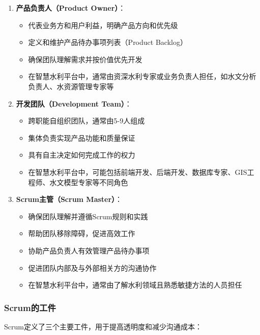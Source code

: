 \begin{enumerate}
\def\labelenumi{\arabic{enumi}.}
\tightlist
\item
  \textbf{产品负责人（Product Owner）}：

  \begin{itemize}
  \tightlist
  \item
    代表业务方和用户利益，明确产品方向和优先级
  \item
    定义和维护产品待办事项列表（Product Backlog）
  \item
    确保团队理解需求并按价值优先开发
  \item
    在智慧水利平台中，通常由资深水利专家或业务负责人担任，如水文分析负责人、水资源管理专家等
  \end{itemize}
\item
  \textbf{开发团队（Development Team）}：

  \begin{itemize}
  \tightlist
  \item
    跨职能自组织团队，通常由5-9人组成
  \item
    集体负责实现产品功能和质量保证
  \item
    具有自主决定如何完成工作的权力
  \item
    在智慧水利平台中，可能包括前端开发、后端开发、数据库专家、GIS工程师、水文模型专家等不同角色
  \end{itemize}
\item
  \textbf{Scrum主管（Scrum Master）}：

  \begin{itemize}
  \tightlist
  \item
    确保团队理解并遵循Scrum规则和实践
  \item
    帮助团队移除障碍，促进高效工作
  \item
    协助产品负责人有效管理产品待办事项
  \item
    促进团队内部及与外部相关方的沟通协作
  \item
    在智慧水利平台中，通常由了解水利领域且熟悉敏捷方法的人员担任
  \end{itemize}
\end{enumerate}

\subsubsection{Scrum的工件}\label{scrumux7684ux5de5ux4ef6}

Scrum定义了三个主要工件，用于提高透明度和减少沟通成本：

